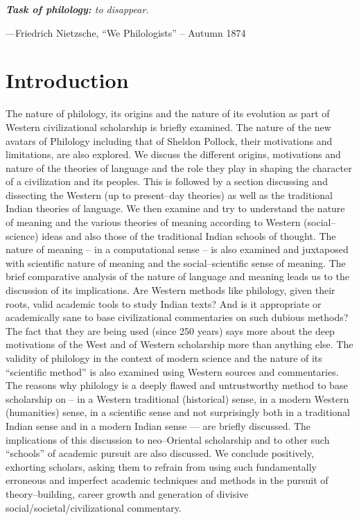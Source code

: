 \textit{\textbf{Task of philology:} to disappear.}

—Friedrich Nietzsche, “We Philologists” – Autumn 1874


\section*{Introduction}

The nature of philology, its origins and the nature of its evolution as part of Western civilizational scholarship is briefly examined. The nature of the new avatars of Philology including that of Sheldon Pollock, their motivations and limitations, are also explored. We discuss the different origins, motivations and nature of the theories of language and the role they play in shaping the character of a civilization and its peoples. This is followed by a section discussing and dissecting the Western (up to present–day theories) as well as the traditional Indian theories of language. We then examine and try to understand the nature of meaning and the various theories of meaning according to Western (social–science) ideas and also those of the traditional Indian schools of thought. The nature of meaning – in a computational sense – is also examined and juxtaposed with scientific nature of meaning and the social–scientific sense of meaning. The brief comparative analysis of the nature of language and meaning leads us to the discussion of its implications. Are Western methods like philology, given their roots, valid academic tools to study Indian texts? And is it appropriate or academically sane to base civilizational commentaries on such dubious methods? The fact that they are being used (since 250 years) says more about the deep motivations of the West and of Western scholarship more than anything else. The validity of philology in the context of modern science and the nature of its “scientific method” is also examined using Western sources and commentaries. The reasons why philology is a deeply flawed and untrustworthy method to base scholarship on – in a Western traditional (historical) sense, in a modern Western (humanities) sense, in a scientific sense and not surprisingly both in a traditional Indian sense and in a modern Indian sense — are briefly discussed. The implications of this discussion to neo–Oriental scholarship and to other such “schools” of academic pursuit are also discussed. We conclude positively, exhorting scholars, asking them to refrain from using such fundamentally erroneous and imperfect academic techniques and methods in the pursuit of theory–building, career growth and generation of divisive social/societal/civilizational commentary.



